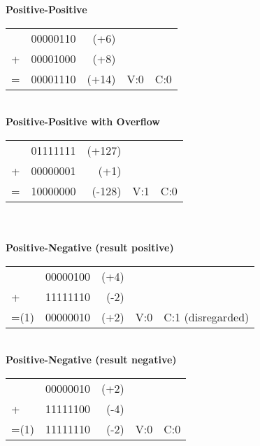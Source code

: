 \documentclass[12pt]{book}
\begin{document}
\noindent\textbf{Positive-Positive}\vspace{-1em}
\begin{table}[H]
\begin{tabular}{lrrcc}
  & 00000110 & (+6)  &     &     \\
+ & 00001000 & (+8)  &     &     \\ \cline{1-3}
= & 00001110 & (+14) & V:0 & C:0
\end{tabular}
\end{table}\vspace{-1em}
\\

\noindent\textbf{Positive-Positive with Overflow}\vspace{-1em}
\begin{table}[H]
\begin{tabular}{lrrcc}
  & 01111111 & (+127) &     &     \\
+ & 00000001 & (+1)   &     &     \\ \cline{1-3}
= & 10000000 & (-128) & V:1 & C:0
\end{tabular}
\end{table}\vspace{-1em}
\\
\\

\noindent\textbf{Positive-Negative (result positive)}\vspace{-1em}
\begin{table}[H]
\begin{tabular}{lrrcc}
     & 00000100 & (+4) &     &                   \\
+    & 11111110 & (-2) &     &                   \\ \cline{1-3}
=(1) & 00000010 & (+2) & V:0 & C:1 (disregarded)
\end{tabular}
\end{table}\vspace{-1em}
\\

\noindent\textbf{Positive-Negative (result negative)}\vspace{-1em}
\begin{table}[H]
\begin{tabular}{lrrcc}
     & 00000010 & (+2) &     &     \\
+    & 11111100 & (-4) &     &     \\ \cline{1-3}
=(1) & 11111110 & (-2) & V:0 & C:0
\end{tabular}
\end{table}\vspace{-1em}
\\
\end{document}
